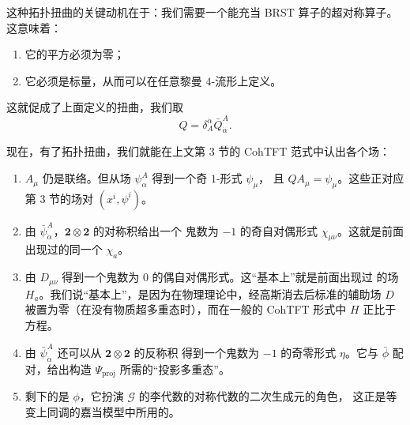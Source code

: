 这种拓扑扭曲的关键动机在于：我们需要一个能充当 BRST 算子的超对称算子。这意味着：
\begin{enumerate}[label=\arabic*., leftmargin=2.2em]
  \item 它的平方必须为零；
  \item 它必须是标量，从而可以在任意黎曼 $4$-流形上定义。
\end{enumerate}
这就促成了上面定义的扭曲，我们取
\begin{equation}
  Q=\delta^{\dot\alpha}_{A}\bar{Q}^{A}_{\dot\alpha}.
  \tag{4.16}
\end{equation}


现在，有了拓扑扭曲，我们就能在上文第 3 节的 CohTFT 范式中认出各个场：
\begin{enumerate}[label=\arabic*., leftmargin=2.2em]
  \item $A_{\mu}$ 仍是联络。但从场 $\psi^{A}_{\alpha}$ 得到一个奇 $1$-形式 $\psi_{\mu}$，
    且 $QA_{\mu}=\psi_{\mu}$。这些正对应第 3 节的场对 $(x^{i},\psi^{i})$。

  \item 由 $\bar{\psi}^{A}_{\dot\alpha}$，$\mathbf{2}\otimes\mathbf{2}$ 的对称积给出一个
    鬼数为 $-1$ 的奇自对偶形式 $\chi_{\mu\nu}$。这就是前面出现过的同一个 $\chi_{a}$。

  \item 由 $D_{\mu\nu}$ 得到一个鬼数为 $0$ 的偶自对偶形式。这“基本上”就是前面出现过
    的场 $H_{a}$。我们说“基本上”，是因为在物理理论中，经高斯消去后标准的辅助场 $D$
    被置为零（在没有物质超多重态时），而在一般的 CohTFT 形式中 $H$ 正比于方程。

  \item 由 $\bar{\psi}^{A}_{\dot\alpha}$ 还可以从 $\mathbf{2}\otimes\mathbf{2}$ 的反称积
    得到一个鬼数为 $-1$ 的奇零形式 $\eta$。它与 $\bar\phi$ 配对，给出构造
    $\Psi_{\mathrm{proj}}$ 所需的“投影多重态”。

  \item 剩下的是 $\phi$，它扮演 $\mathcal{G}$ 的李代数的对称代数的二次生成元的角色，
    这正是等变上同调的嘉当模型中所用的。
\end{enumerate}

